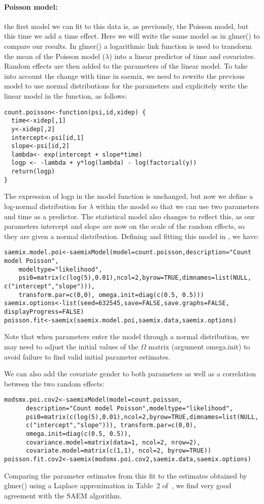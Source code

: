 \paragraph{Poisson model:} the first model we can fit to this data is, as previously, the Poisson model, but this time we add a time effect. Here we will write the same model as in {\sf glmer()} to compare our results. In {\sf glmer()} a logarithmic link function is used to transform the mean of the Poisson model ($\lambda$) into a linear predictor of time and covariates. Random effects are then added to the parameters of the linear model. To take into account the change with time in {\sf saemix}, we need to rewrite the previous model to use normal distributions for the parameters and explicitely write the linear model in the function, as follows:
\begin{verbatim}
count.poisson<-function(psi,id,xidep) { 
  time<-xidep[,1]
  y<-xidep[,2]
  intercept<-psi[id,1]
  slope<-psi[id,2]
  lambda<- exp(intercept + slope*time)
  logp <- -lambda + y*log(lambda) - log(factorial(y))
  return(logp)
}
\end{verbatim}
The expression of logp in the model function is unchanged, but now we define a log-normal distribution for $\lambda$ within the model so that we can use two parameters and time as a predictor. The statistical model also changes to reflect this, as our parameters intercept and slope are now on the scale of the random effects, so they are given a normal distribution. Defining and fitting this model in \monolix, we have:
\begin{verbatim}
saemix.model.poi<-saemixModel(model=count.poisson,description="Count model Poisson",
    modeltype="likelihood",   
    psi0=matrix(c(log(5),0.01),ncol=2,byrow=TRUE,dimnames=list(NULL, c("intercept","slope"))), 
    transform.par=c(0,0), omega.init=diag(c(0.5, 0.5)))
saemix.options<-list(seed=632545,save=FALSE,save.graphs=FALSE, displayProgress=FALSE)
poisson.fit<-saemix(saemix.model.poi,saemix.data,saemix.options)
\end{verbatim}
Note that when parameters enter the model through a normal distribution, we may need to adjust the initial values of the $\Omega$ matrix (argument {\sf omega.init}) to avoid failure to find valid initial parameter estimates.

We can also add the covariate gender to both parameters as well as a correlation between the two random effects:
\begin{verbatim}
modsmx.poi.cov2<-saemixModel(model=count.poisson,
      description="Count model Poisson",modeltype="likelihood",   
      psi0=matrix(c(log(5),0.01),ncol=2,byrow=TRUE,dimnames=list(NULL, 
      c("intercept","slope"))), transform.par=c(0,0), 
      omega.init=diag(c(0.5, 0.5)), 
      covariance.model=matrix(data=1, ncol=2, nrow=2),
      covariate.model=matrix(c(1,1), ncol=2, byrow=TRUE))
poisson.fit.cov2<-saemix(modsmx.poi.cov2,saemix.data,saemix.options)
\end{verbatim}
Comparing the parameter estimates from this fit to the estimates obtained by {\sf glmer()} using a Laplace approximation in Table~2 of~\cite{Atkins13}, we find very good agreement with the SAEM algorithm.

